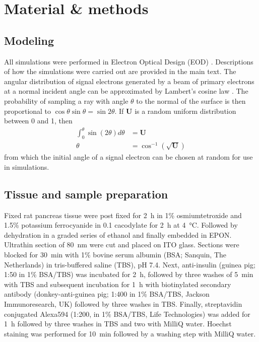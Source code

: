 \section{Material \& methods}
\label{sec:2.4_methods}

\subsection{Modeling}
\label{sec:2.4.1_modeling}

All simulations were performed in Electron Optical Design (EOD) \cite{lencova2008new}. Descriptions of how the simulations were carried out are provided in the main text. The angular distribution of signal electrons generated by a beam of primary electrons at a normal incident angle can be approximated by Lambert's cosine law \cite{reimer1998emission}. The probability of sampling a ray with angle $\theta$ to the normal of the surface is then proportional to $\cos\theta \sin\theta = \sin 2\theta$. If $\boldsymbol{U}$ is a random uniform distribution between 0 and 1, then
%
\begin{align}
    \int_0^\theta \sin \left( 2\theta \right) d\theta &= \boldsymbol{U} \\
    \theta &= \cos^{-1} \left( \sqrt{\boldsymbol{U}} \right)
\end{align}
%
from which the initial angle of a signal electron can be chosen at random for use in simulations.


\subsection{Tissue and sample preparation}
\label{sec:2.4.2_sampleprep}

Fixed rat pancreas tissue were post fixed for \SI{2}{\hour} in 1\% osmiumtetroxide and 1.5\% potassium ferrocyanide in \SI{0.1}{\molar} cacodylate for \SI{2}{\hour} at \SI{4}{\celsius}. Followed by dehydration in a graded series of ethanol and finally embedded in EPON. Ultrathin section of \SI{80}{\nano\meter} were cut and placed on ITO glass. Sections were blocked for \SI{30}{\minute} with 1\% bovine serum albumin (BSA; Sanquin, The Netherlands) in tris-buffered saline (TBS), pH 7.4. Next, anti-insulin (guinea pig; 1:50 in 1\% BSA/TBS) was incubated for \SI{2}{\hour}, followed by three washes of \SI{5}{\minute} with TBS and subsequent incubation for \SI{1}{\hour} with biotinylated secondary antibody (donkey-anti-guinea pig; 1:400 in 1\% BSA/TBS, Jackson Immunoresearch, UK) followed by three washes in TBS. Finally, streptavidin conjugated Alexa594 (1:200, in 1\% BSA/TBS, Life Technologies) was added for \SI{1}{\hour} followed by three washes in TBS and two with MilliQ water. Hoechst staining was performed for \SI{10}{\minute} followed by a washing step with MilliQ water.

